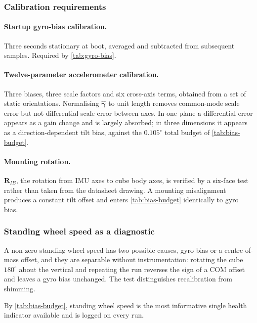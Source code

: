 \subsubsection{Calibration requirements}
\label{sec:calibration}

\paragraph{Startup gyro-bias calibration.} Three seconds stationary at boot,
averaged and subtracted from subsequent samples. Required by
\cref{tab:gyro-bias}.

\paragraph{Twelve-parameter accelerometer calibration.} Three biases, three
scale factors and six cross-axis terms, obtained from a set of static
orientations. Normalising $\hat{\bm{\gamma}}$ to unit length removes
common-mode scale error but not differential scale error between axes. In one
plane a differential error appears as a gain change and is largely absorbed;
in three dimensions it appears as a direction-dependent tilt bias, against
the $0.105^\circ$ total budget of \cref{tab:bias-budget}.

\label{sec:imu_mount}
\paragraph{Mounting rotation.} $\bm{R}_{IB}$, the rotation from IMU axes to
cube body axes, is verified by a six-face test rather than taken from the
datasheet drawing. A mounting misalignment produces a constant tilt offset
and enters \cref{tab:bias-budget} identically to gyro bias.

\subsubsection{Standing wheel speed as a diagnostic}
\label{sec:diagnostic}

A non-zero standing wheel speed has two possible causes, gyro bias or a
centre-of-mass offset, and they are separable without instrumentation:
rotating the cube $180^\circ$ about the vertical and repeating the run
reverses the sign of a COM offset and leaves a gyro bias unchanged. The test
distinguishes recalibration from shimming.

By \cref{tab:bias-budget}, standing wheel speed is the most informative
single health indicator available and is logged on every run.

